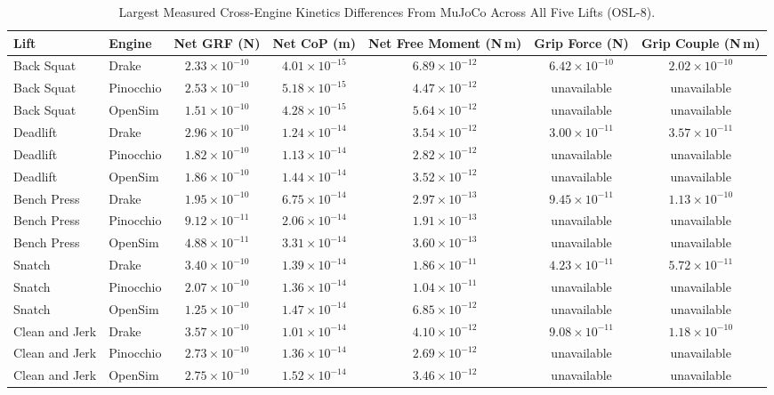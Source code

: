 \documentclass[11pt,a4paper]{article}
\begin{document}
\begin{table}[h]
\centering\footnotesize\setlength{\tabcolsep}{3pt}
\begin{tabular}{llccccc}
\toprule
Lift & Engine & Net GRF (N) & Net CoP (m) & Net Free Moment (N\,m) & Grip Force (N) & Grip Couple (N\,m) \\
\midrule
Back Squat & Drake & $2.33\times 10^{-10}$ & $4.01\times 10^{-15}$ & $6.89\times 10^{-12}$ & $6.42\times 10^{-10}$ & $2.02\times 10^{-10}$ \\
Back Squat & Pinocchio & $2.53\times 10^{-10}$ & $5.18\times 10^{-15}$ & $4.47\times 10^{-12}$ & unavailable & unavailable \\
Back Squat & OpenSim & $1.51\times 10^{-10}$ & $4.28\times 10^{-15}$ & $5.64\times 10^{-12}$ & unavailable & unavailable \\
\midrule
Deadlift & Drake & $2.96\times 10^{-10}$ & $1.24\times 10^{-14}$ & $3.54\times 10^{-12}$ & $3.00\times 10^{-11}$ & $3.57\times 10^{-11}$ \\
Deadlift & Pinocchio & $1.82\times 10^{-10}$ & $1.13\times 10^{-14}$ & $2.82\times 10^{-12}$ & unavailable & unavailable \\
Deadlift & OpenSim & $1.86\times 10^{-10}$ & $1.44\times 10^{-14}$ & $3.52\times 10^{-12}$ & unavailable & unavailable \\
\midrule
Bench Press & Drake & $1.95\times 10^{-10}$ & $6.75\times 10^{-14}$ & $2.97\times 10^{-13}$ & $9.45\times 10^{-11}$ & $1.13\times 10^{-10}$ \\
Bench Press & Pinocchio & $9.12\times 10^{-11}$ & $2.06\times 10^{-14}$ & $1.91\times 10^{-13}$ & unavailable & unavailable \\
Bench Press & OpenSim & $4.88\times 10^{-11}$ & $3.31\times 10^{-14}$ & $3.60\times 10^{-13}$ & unavailable & unavailable \\
\midrule
Snatch & Drake & $3.40\times 10^{-10}$ & $1.39\times 10^{-14}$ & $1.86\times 10^{-11}$ & $4.23\times 10^{-11}$ & $5.72\times 10^{-11}$ \\
Snatch & Pinocchio & $2.07\times 10^{-10}$ & $1.36\times 10^{-14}$ & $1.04\times 10^{-11}$ & unavailable & unavailable \\
Snatch & OpenSim & $1.25\times 10^{-10}$ & $1.47\times 10^{-14}$ & $6.85\times 10^{-12}$ & unavailable & unavailable \\
\midrule
Clean and Jerk & Drake & $3.57\times 10^{-10}$ & $1.01\times 10^{-14}$ & $4.10\times 10^{-12}$ & $9.08\times 10^{-11}$ & $1.18\times 10^{-10}$ \\
Clean and Jerk & Pinocchio & $2.73\times 10^{-10}$ & $1.36\times 10^{-14}$ & $2.69\times 10^{-12}$ & unavailable & unavailable \\
Clean and Jerk & OpenSim & $2.75\times 10^{-10}$ & $1.52\times 10^{-14}$ & $3.46\times 10^{-12}$ & unavailable & unavailable \\
\bottomrule
\end{tabular}
\caption{Largest Measured Cross-Engine Kinetics Differences From MuJoCo Across All Five Lifts (OSL-8).}
\label{tab:kinetics-parity-all-five}
\end{table}
\end{document}
